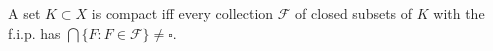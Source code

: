 A set $K \subset X$ is compact iff every collection $\mathcal{F}$ of closed subsets of $K$ with the f.i.p. has $\bigcap \{F: F \in \mathcal{F}\} \neq \square$.